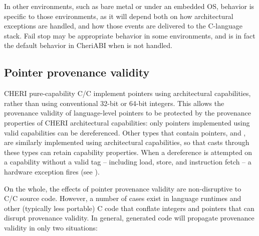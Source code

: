 \documentclass[12pt,twoside,openright,usletter]{article}
\newcommand{\ccode}[1]{{\small\ttfamily{#1}}}
\newcommand{\cuintptrt}{{\ccode{uintptr\_t}}\xspace}
\newcommand{\cintptrt}{{\ccode{intptr\_t}}\xspace}
\newcommand{\SIGPROT}{{\ccode{SIGPROT}}\xspace}
\newcommand{\note}[2]{{\color{blue}[ Note: #1 - #2]}}
\renewcommand{\note}[2]{\relax\ifhmode\unskip\fi}
\newcommand{\arnote}[1]{\note{#1}{Alex R.}}
\newcommand{\rwnote}[1]{\note{#1}{Robert W.}}
\newcommand{\psnote}[1]{\note{#1}{Peter S.}}
\newcommand*{\cpp}[1][]{C\textsmaller[2]{\nolinebreak[4]\hspace{-.05em}\raisebox{.45ex}{\textbf{++}}}}
\newcommand*{\purecapCOrCpp}[1]{CHERI pure-capability C/\cpp{}}
\begin{document}
In other environments, such as bare metal or under an embedded OS, behavior is
specific to those environments, as it will depend both on how architectural
exceptions are handled, and how those events are delivered to the C-language
stack.
Fail stop may be appropriate behavior in some environments, and is in fact the
default behavior in CheriABI when \SIGPROT is not handled.

\rwnote{We've opted to use the term ``hardware exception'' throughout, and
  mention ``traps'' only here.  This could cause confusion with respect to \cpp{}
  exceptions .. but perhaps less so than if we used the word ``exception''
  unadorned.}

\subsection{Pointer provenance validity}
\label{sec:pointer_provenance_validity}

\purecapCOrCpp{} implement pointers using architectural
capabilities, rather than using conventional 32-bit or 64-bit integers.
This allows the provenance validity of language-level pointers to be
protected by the provenance properties of CHERI architectural capabilities:
only pointers implemented using valid capabilities can be dereferenced.
Other types that contain pointers, \cuintptrt and \cintptrt,
are similarly implemented
using architectural capabilities, so that casts through these types
can retain capability properties.
When a dereference is attempted on a capability without a valid tag --
including load, store, and instruction fetch -- a hardware exception fires
(see ).

On the whole, the effects of pointer provenance validity are non-disruptive to
C/\cpp{} source code.
However, a number of cases exist in language runtimes and other
(typically less portable) C code that conflate integers and pointers that can
disrupt provenance validity.
In general, generated code will propagate provenance validity in only two
situations:
\end{document}
